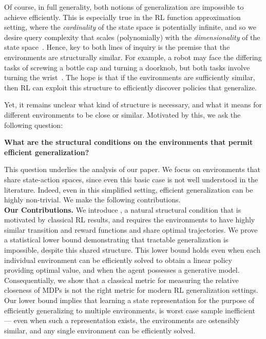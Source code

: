 \documentclass[11pt,twoside]{article}
\begin{document}
Of course, in full generality, both notions of generalization are impossible to achieve efficiently. This is especially true in the RL function approximation setting, where the \emph{cardinality} of the state space is potentially infinite, and so we desire query complexity that scales (polynomially) with the \emph{dimensionality} of the state space~\citep{du19shiftoracle, vanroy19, du20, lattimore20featurerep, weisz2021queryefficient}. Hence, key to both lines of inquiry is the premise that the environments are structurally similar. For example, a robot may face the differing tasks of screwing a bottle cap and turning a doorknob, but both tasks involve turning the wrist~\citep{rakelly19}. The hope is that if the environments are sufficiently similar, then RL can exploit this structure to efficiently discover policies that generalize.

Yet, it remains unclear what kind of structure is necessary, and what it means for different environments to be close or similar. Motivated by this, we ask the following question:
\begin{center}
\textbf{What are the structural conditions on the environments that permit efficient generalization?}
\end{center}
This question underlies the analysis of our paper. We focus on environments that share state-action spaces, since even this basic case is not well understood in the literature. Indeed, even in this simplified setting, efficient generalization can be highly non-trivial. We make the following contributions. \\

\noindent \textbf{Our Contributions.} We introduce \emph{\weakprox}, a natural structural condition that is motivated by classical RL results, and requires the environments to have highly similar transition and reward functions and share optimal trajectories. We prove a statistical lower bound demonstrating that tractable generalization is impossible, despite this shared structure. This lower bound holds even when each individual environment can be efficiently solved to obtain a linear policy providing optimal value, and when the agent possesses a generative model. Consequentially, we show that a classical metric for measuring the relative closeness of MDPs is not the right metric for modern RL generalization settings. Our lower bound implies that learning a state representation for the purpose of efficiently generalizing to multiple environments, is worst case sample inefficient --- even when such a representation exists, the environments are ostensibly similar, and any single environment can be efficiently solved.
\end{document}
